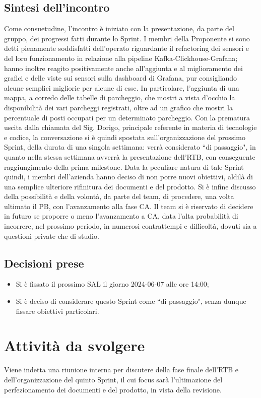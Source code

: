 \documentclass[8pt]{article}
\newcommand{\signatureline}[1]{%
	 \par\vspace{0.5cm}
	\noindent\makebox[\linewidth][r]{\rule{0.2\textwidth}{0.5pt}\hspace{3cm}\makebox[0pt][r]{\vspace{3pt}\footnotesize #1}}%
}
\begin{document}
\subsection{Sintesi dell'incontro}
Come consuetudine, l'incontro è iniziato con la presentazione, da parte del gruppo, dei progressi fatti durante lo Sprint. I membri della
Proponente si sono detti pienamente soddisfatti dell'operato riguardante il refactoring dei sensori e del loro funzionamento in relazione
alla pipeline Kafka-Clickhouse-Grafana; hanno inoltre reagito positivamente anche all'aggiunta e al miglioramento dei grafici e delle viste
sui sensori sulla dashboard di Grafana, pur consigliando alcune semplici migliorie per alcune di esse. In particolare, l'aggiunta di una
mappa, a corredo delle tabelle di parcheggio, che mostri a vista d'occhio la disponibilità dei vari parcheggi registrati, oltre ad un
grafico che mostri la percentuale di posti occupati per un determinato parcheggio. Con la prematura uscita dalla chiamata del Sig. Dorigo,
principale referente in materia di tecnologie e codice, la conversazione si è quindi spostata sull'organizzazione del prossimo Sprint, della
durata di una singola settimana: verrà considerato ``di passaggio", in quanto nella stessa settimana avverrà la presentazione dell'RTB, con conseguente
raggiungimento della prima milestone. Data la peculiare natura di tale Sprint quindi, i membri dell'azienda hanno deciso di non porre nuovi obiettivi,
aldilà di una semplice ulteriore rifinitura dei documenti e del prodotto. Si è infine discusso della possibilità e della volontà, da parte del 
team, di procedere, una volta ultimato il PB, con l'avanzamento alla fase CA. Il team si è riservato di decidere in futuro se proporre o meno 
l'avanzamento a CA, data l'alta probabilità di incorrere, nel prossimo periodo, in numerosi contrattempi e difficoltà, dovuti sia a questioni 
private che di studio. 

\subsection{Decisioni prese}
\begin{itemize}
	\setlength\itemsep{0em}
	\item Si è fissato il prossimo SAL il giorno 2024-06-07 alle ore 14:00;
	\item Si è deciso di considerare questo Sprint come ``di passaggio", senza dunque fissare obiettivi particolari.
\end{itemize}
\newpage
\section{Attività da svolgere}
Viene indetta una riunione interna per discutere della fase finale dell'RTB e dell'organizzazione del quinto Sprint, il cui focus
sarà l'ultimazione del perfezionamento dei documenti e del prodotto, in vista della revisione. 
\signatureline{Padova, 2024-06-04}
\end{document}

